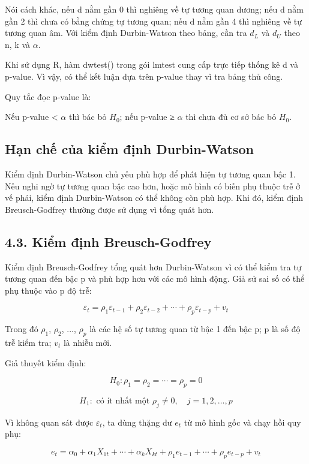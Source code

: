\documentclass[12pt,a4paper]{article}
\begin{document}
Nói cách khác, nếu d nằm gần 0 thì nghiêng về tự tương quan dương; nếu d
nằm gần 2 thì chưa có bằng chứng tự tương quan; nếu d nằm gần 4 thì
nghiêng về tự tương quan âm. Với kiểm định Durbin-Watson theo bảng, cần
tra \(d_L\) và \(d_U\) theo n, k và \(\alpha\).

Khi sử dụng R, hàm dwtest() trong gói lmtest cung cấp trực tiếp thống kê
d và p-value. Vì vậy, có thể kết luận dựa trên p-value thay vì tra bảng
thủ công.

Quy tắc đọc p-value là:

Nếu p-value < \(\alpha\) thì bác bỏ \(H_0\); nếu p-value ≥ \(\alpha\) thì chưa đủ cơ
sở bác bỏ \(H_0\).

\subsection{Hạn chế của kiểm định
Durbin-Watson}\label{hux1ea1n-chux1ebf-cux1ee7a-kiux1ec3m-ux111ux1ecbnh-durbin-watson}

Kiểm định Durbin-Watson chủ yếu phù hợp để phát hiện tự tương quan bậc
1. Nếu nghi ngờ tự tương quan bậc cao hơn, hoặc mô hình có biến phụ
thuộc trễ ở vế phải, kiểm định Durbin-Watson có thể không còn phù hợp.
Khi đó, kiểm định Breusch-Godfrey thường được sử dụng vì tổng quát hơn.

\subsection{4.3. Kiểm định
Breusch-Godfrey}\label{kiux1ec3m-ux111ux1ecbnh-breusch-godfrey}

Kiểm định Breusch-Godfrey tổng quát hơn Durbin-Watson vì có thể kiểm tra
tự tương quan đến bậc p và phù hợp hơn với các mô hình động. Giả sử sai
số có thể phụ thuộc vào p độ trễ:

\[
\varepsilon_t=\rho_1\varepsilon_{t-1}+\rho_2\varepsilon_{t-2}+\cdots+\rho_p\varepsilon_{t-p}+v_t
\]

Trong đó \(\rho_1\), \(\rho_2\), ..., \(\rho_p\) là các hệ số tự tương quan từ bậc 1 đến bậc p;
p là số độ trễ kiểm tra; \(v_t\) là nhiễu mới.

Giả thuyết kiểm định:

\[
H_0:\rho_1=\rho_2=\cdots=\rho_p=0
\]

\[
H_1:\text{ có ít nhất một }\rho_j\neq 0,\quad j=1,2,\ldots,p
\]

Vì không quan sát được \(\varepsilon_t\), ta dùng thặng dư \(e_t\) từ mô hình gốc và chạy
hồi quy phụ:

\[
e_t=\alpha_0+\alpha_1X_{1t}+\cdots+\alpha_kX_{kt}+\rho_1e_{t-1}+\cdots+\rho_pe_{t-p}+v_t
\]
\end{document}
